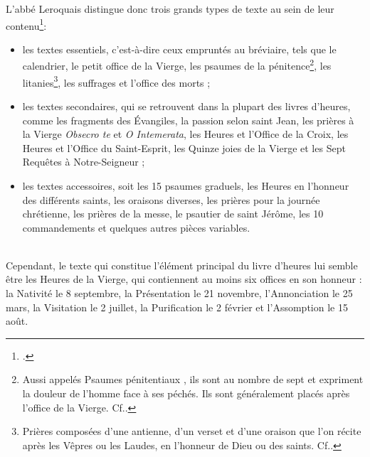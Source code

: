 \documentclass[a4paper,12pt,twoside]{book}
\begin{document}
	L'abbé Leroquais distingue donc trois grands types de texte au sein de leur contenu\footcite[p. XIV]{Leroquais_notices}:
	\begin{itemize}
	    \item les textes essentiels, c'est-à-dire ceux empruntés au bréviaire, tels que le calendrier, le petit office de la Vierge, les psaumes de la pénitence\footnote{Aussi appelés \og Psaumes pénitentiaux \fg{}, ils sont au nombre de sept et expriment la douleur de l'homme face à ses péchés. Ils sont généralement placés après l'office de la Vierge. Cf.\cite[p. XX-XXI]{Leroquais_notices}.}, les litanies\footnote{Prières composées d’une antienne, d’un verset et d’une oraison que l’on récite après les Vêpres ou les Laudes, en l’honneur de Dieu ou des saints. Cf.\cite[p. XXI]{Leroquais_notices}.}, les suffrages et l’office des morts ;
	    \item les textes secondaires, qui se retrouvent dans la plupart des livres d'heures, comme les fragments des Évangiles, la passion selon saint Jean, les prières à la Vierge \textit{Obsecro te} et \textit{O Intemerata}, les Heures et l’Office de la Croix, les Heures et l’Office du Saint-Esprit, les Quinze joies de la Vierge et les Sept Requêtes à Notre-Seigneur ;
	    \item les textes accessoires, soit les 15 psaumes graduels, les Heures en l’honneur des différents saints, les oraisons diverses, les prières pour la journée chrétienne, les prières de la messe, le psautier de saint Jérôme, les 10 commandements et quelques autres pièces variables.
	\end{itemize} \\
	
	Cependant, le texte qui constitue l'élément principal du livre d'heures lui semble être les Heures de la Vierge, qui contiennent au moins six offices en son honneur : la Nativité le 8 septembre, la Présentation le 21 novembre, l'Annonciation le 25 mars, la Visitation le 2 juillet, la Purification le 2 février et l'Assomption le 15 août. 
	
\end{document}
